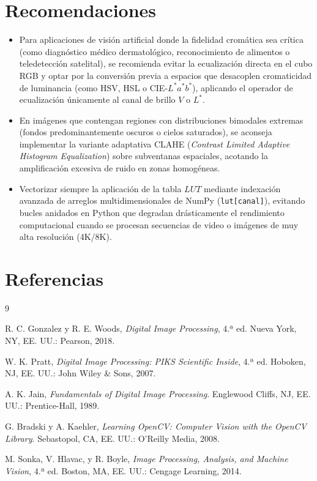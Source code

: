 \documentclass[12pt,a4paper]{article}
\begin{document}
\section{Recomendaciones}

\begin{itemize}[leftmargin=1.2cm]
    \item Para aplicaciones de visión artificial donde la fidelidad cromática sea crítica (como diagnóstico médico dermatológico, reconocimiento de alimentos o teledetección satelital), se recomienda evitar la ecualización directa en el cubo RGB y optar por la conversión previa a espacios que desacoplen cromaticidad de luminancia (como HSV, HSL o CIE-$L^*a^*b^*$), aplicando el operador de ecualización únicamente al canal de brillo $V$ o $L^*$.
    
    \item En imágenes que contengan regiones con distribuciones bimodales extremas (fondos predominantemente oscuros o cielos saturados), se aconseja implementar la variante adaptativa CLAHE (\textit{Contrast Limited Adaptive Histogram Equalization}) sobre subventanas espaciales, acotando la amplificación excesiva de ruido en zonas homogéneas.
    
    \item Vectorizar siempre la aplicación de la tabla $LUT$ mediante indexación avanzada de arreglos multidimensionales de NumPy (\texttt{lut[canal]}), evitando bucles anidados en Python que degradan drásticamente el rendimiento computacional cuando se procesan secuencias de video o imágenes de muy alta resolución (4K/8K).
\end{itemize}

\section{Referencias}

\begin{thebibliography}{9}

R. C. Gonzalez y R. E. Woods, \textit{Digital Image Processing}, 4.ª ed. Nueva York, NY, EE. UU.: Pearson, 2018.

W. K. Pratt, \textit{Digital Image Processing: PIKS Scientific Inside}, 4.ª ed. Hoboken, NJ, EE. UU.: John Wiley \& Sons, 2007.

A. K. Jain, \textit{Fundamentals of Digital Image Processing}. Englewood Cliffs, NJ, EE. UU.: Prentice-Hall, 1989.

G. Bradski y A. Kaehler, \textit{Learning OpenCV: Computer Vision with the OpenCV Library}. Sebastopol, CA, EE. UU.: O'Reilly Media, 2008.

M. Sonka, V. Hlavac, y R. Boyle, \textit{Image Processing, Analysis, and Machine Vision}, 4.ª ed. Boston, MA, EE. UU.: Cengage Learning, 2014.

\end{thebibliography}
\end{document}
